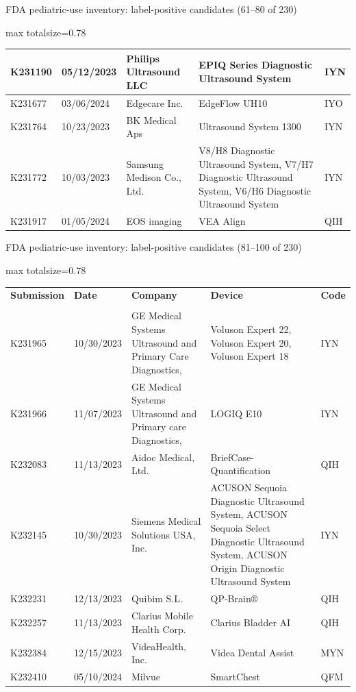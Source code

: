 \documentclass[aspectratio=169]{beamer}
\renewcommand{\arraystretch}{1.08}
\begin{document}
\begin{frame}[category=FDA appendix]{FDA pediatric-use inventory: label-positive candidates (61--80 of 230)}
\begin{adjustbox}{max totalsize={\textwidth}{0.78\textheight}}
\begin{tabular}{|p{}|p{}|p{}|p{}|p{}|}
K231190 & 05/12/2023 & Philips Ultrasound LLC & EPIQ Series Diagnostic Ultrasound System & IYN \\ \hline
K231677 & 03/06/2024 & Edgecare Inc. & EdgeFlow UH10 & IYO \\ \hline
K231764 & 10/23/2023 & BK Medical Aps & Ultrasound System 1300 & IYN \\ \hline
K231772 & 10/03/2023 & Samsung Medison Co., Ltd. & V8/H8 Diagnostic Ultrasound System, V7/H7 Diagnostic Ultrasound System, V6/H6 Diagnostic Ultrasound System & IYN \\ \hline
K231917 & 01/05/2024 & EOS imaging & VEA Align & QIH \\ \hline
\end{tabular}
\end{adjustbox}
\end{frame}
\begin{frame}[category=FDA appendix]{FDA pediatric-use inventory: label-positive candidates (81--100 of 230)}
\begin{adjustbox}{max totalsize={\textwidth}{0.78\textheight}}
\renewcommand{\arraystretch}{1.2}
\begin{tabular}{|p{}|p{}|p{}|p{}|p{}|}
\hline \textbf{Submission} & \textbf{Date} & \textbf{Company} & \textbf{Device} & \textbf{Code} \\\\ \hline
K231965 & 10/30/2023 & GE Medical Systems Ultrasound and Primary Care Diagnostics, & Voluson Expert 22, Voluson Expert 20, Voluson Expert 18 & IYN \\ \hline
K231966 & 11/07/2023 & GE Medical Systems Ultrasound and Primary care Diagnostics, & LOGIQ E10 & IYN \\ \hline
K232083 & 11/13/2023 & Aidoc Medical, Ltd. & BriefCase-Quantification & QIH \\ \hline
K232145 & 10/30/2023 & Siemens Medical Solutions USA, Inc. & ACUSON Sequoia Diagnostic Ultrasound System, ACUSON Sequoia Select Diagnostic Ultrasound System, ACUSON Origin Diagnostic Ultrasound System & IYN \\ \hline
K232231 & 12/13/2023 & Quibim S.L. & QP-Brain® & QIH \\ \hline
K232257 & 11/13/2023 & Clarius Mobile Health Corp. & Clarius Bladder AI & QIH \\ \hline
K232384 & 12/15/2023 & VideaHealth, Inc. & Videa Dental Assist & MYN \\ \hline
K232410 & 05/10/2024 & Milvue & SmartChest & QFM \\ \hline

\end{tabular}
\end{adjustbox}
\end{frame}
\end{document}

